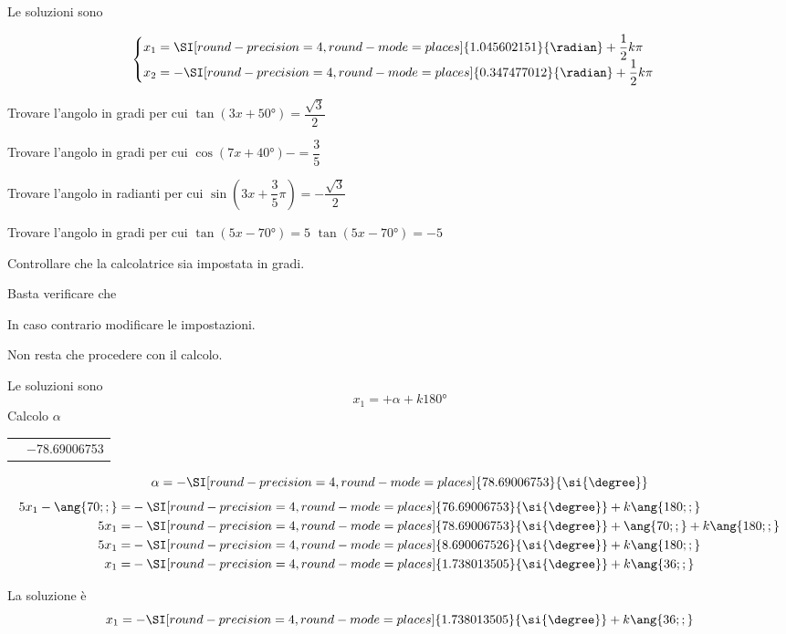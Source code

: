\begin{exercise}
 	Le soluzioni sono
 	
 	\[\begin{cases}
x_1=\SI[round-precision=\lungarrotandamento,round-mode=places]{1.045602151}{\radian}+\dfrac{1}{2}k\pi\\
x_2=-\SI[round-precision=\lungarrotandamento,round-mode=places]{0.347477012}{\radian}+\dfrac{1}{2}k\pi\\
 	\end{cases}\]
 \end{exercise}
 \begin{exercise}[no solution]
 	Trovare l'angolo in gradi per cui $\tan (3x+\ang{50;;})=\dfrac{\sqrt{3}}{2}$
 \end{exercise}
 \begin{exercise}[no solution]
 	Trovare l'angolo in gradi per cui $\cos (7x+\ang{40;;})-=\dfrac{3}{5}$
 \end{exercise}
 \begin{exercise}[no solution]
 	Trovare l'angolo in radianti per cui $\sin (3x+\dfrac{3}{5}\pi)=-\dfrac{\sqrt{3}}{2}$
 \end{exercise}
\begin{exercise}
	Trovare l'angolo in gradi per cui $\tan (5x-\ang{70;;})=5$
	\tcblower
	$\tan (5x-\ang{70;;})=-5$
	
	Controllare che la calcolatrice sia impostata in gradi.
	
	Basta verificare che 
	\testgradi
	
	In caso contrario modificare le impostazioni.
	
	Non resta che procedere con il calcolo.
	
	Le soluzioni sono 
	\[x_1=+\alpha+k\ang{180;;}\]
	Calcolo $\alpha$
	\begin{center}
		\begin{tabular}{ll}
			\tastoitan\tasto{\num[round-precision=1,round-mode=places]{5}}
			\tastouguale&\num[round-precision=\lungarrotandamento,round-mode=places]{-78.69006753} 
		\end{tabular} 
	\end{center}
	\[\alpha=-\SI[round-precision=\lungarrotandamento,round-mode=places]{78.69006753}{\si{\degree}}\]
	\begin{align*}
	5x_1-\ang{70;;}=&-\SI[round-precision=\lungarrotandamento,round-mode=places]{76.69006753}{\si{\degree}}+k\ang{180;;}\\
	5x_1=&-\SI[round-precision=\lungarrotandamento,round-mode=places]{78.69006753}{\si{\degree}}+\ang{70;;}+k\ang{180;;}\\
	5x_1=&-\SI[round-precision=\lungarrotandamento,round-mode=places]{8.690067526}{\si{\degree}}+k\ang{180;;}\\
	x_1=&-\SI[round-precision=\lungarrotandamento,round-mode=places]{1.738013505}{\si{\degree}}+k\ang{36;;}
	\end{align*}
	
	La soluzione è
	\[x_1=-\SI[round-precision=\lungarrotandamento,round-mode=places]{1.738013505}{\si{\degree}}+k\ang{36;;}\]
\end{exercise}
